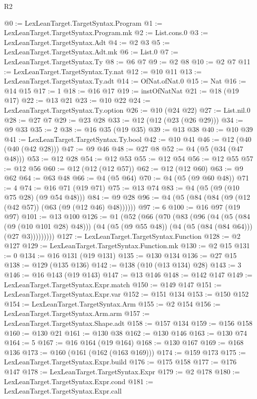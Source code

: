 \begin{lexlean}{R2}
\begin{coremodule}
@0 := LexLeanTarget.TargetSyntax.Program
@1 := LexLeanTarget.TargetSyntax.Program.mk
@2 := List.cons.{0}
@3 := LexLeanTarget.TargetSyntax.Adt
@4 := @2 @3
@5 := LexLeanTarget.TargetSyntax.Adt.mk
@6 := List.{0}
@7 := LexLeanTarget.TargetSyntax.Ty
@8 := @6 @7
@9 := @2 @8
@10 := @2 @7
@11 := LexLeanTarget.TargetSyntax.Ty.nat
@12 := @10 @11
@13 := LexLeanTarget.TargetSyntax.Ty.adt
@14 := OfNat.ofNat.{0}
@15 := Nat
@16 := @14 @15
@17 := 1
@18 := @16 @17
@19 := instOfNatNat
@21 := @18 (@19 @17)
@22 := @13 @21
@23 := @10 @22
@24 := LexLeanTarget.TargetSyntax.Ty.option
@26 := @10 (@24 @22)
@27 := List.nil.{0}
@28 := @27 @7
@29 := @23 @28
@33 := @12 (@12 (@23 (@26 @29)))
@34 := @9 @33
@35 := 2
@38 := @16 @35 (@19 @35)
@39 := @13 @38
@40 := @10 @39
@41 := LexLeanTarget.TargetSyntax.Ty.bool
@42 := @10 @41
@46 := @12 (@40 (@40 (@42 @28)))
@47 := @9 @46
@48 := @27 @8
@52 := @4 (@5 (@34 (@47 @48)))
@53 := @12 @28
@54 := @12 @53
@55 := @12 @54
@56 := @12 @55
@57 := @12 @56
@60 := @12 (@12 (@12 @57))
@62 := @12 (@12 @60)
@63 := @9 @62
@64 := @63 @48
@66 := @4 (@5 @64)
@70 := @4 (@5 (@9 @60 @48))
@71 := 4
@74 := @16 @71 (@19 @71)
@75 := @13 @74
@83 := @4 (@5 (@9 (@10 @75 @28) (@9 @54 @48)))
@84 := @9 @28
@96 := @4 (@5 (@84 (@84 (@9 (@12 (@42 @57)) (@63 (@9 (@12 @46) @48))))))
@97 := 6
@100 := @16 @97 (@19 @97)
@101 := @13 @100
@126 := @1
    (@52
      (@66
        (@70
          (@83
            (@96
              (@4
                (@5 (@84 (@9 (@10 @101 @28) @48)))
                (@4 (@5 (@9 @55 @48)) (@4 (@5 (@84 (@84 @64))) (@27 @3)))))))))
@127 := LexLeanTarget.TargetSyntax.Function
@128 := @2 @127
@129 := LexLeanTarget.TargetSyntax.Function.mk
@130 := @2 @15
@131 := 0
@134 := @16 @131 (@19 @131)
@135 := @130 @134
@136 := @27 @15
@138 := @129 (@135 @136)
@142 := @138 (@10 (@13 @134) @28)
@143 := 3
@146 := @16 @143 (@19 @143)
@147 := @13 @146
@148 := @142 @147
@149 := LexLeanTarget.TargetSyntax.Expr.match
@150 := @149 @147
@151 := LexLeanTarget.TargetSyntax.Expr.var
@152 := @151 @134
@153 := @150 @152
@154 := LexLeanTarget.TargetSyntax.Arm
@155 := @2 @154
@156 := LexLeanTarget.TargetSyntax.Arm.arm
@157 := LexLeanTarget.TargetSyntax.Shape.adt
@158 := @157 @134
@159 := @156 @158
@160 := @130 @21
@161 := @130 @38
@162 := @130 @146
@163 := @130 @74
@164 := 5
@167 := @16 @164 (@19 @164)
@168 := @130 @167
@169 := @168 @136
@173 := @160 (@161 (@162 (@163 @169)))
@174 := @159 @173
@175 := LexLeanTarget.TargetSyntax.Expr.build
@176 := @175 @158
@177 := @176 @147
@178 := LexLeanTarget.TargetSyntax.Expr
@179 := @2 @178
@180 := LexLeanTarget.TargetSyntax.Expr.cond
@181 := LexLeanTarget.TargetSyntax.Expr.call

\end{coremodule}
\end{lexlean}
